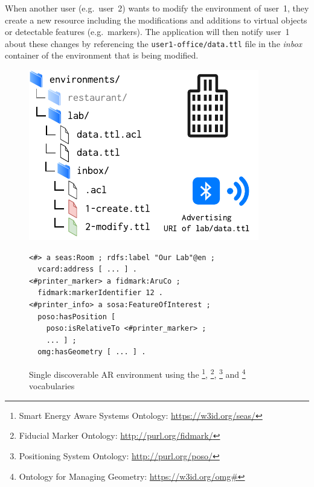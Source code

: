 When another user (e.g.~user~2) wants to modify the environment of user~1, they create a new resource including the modifications and additions to virtual objects or detectable features (e.g.~markers). The application will then notify user~1 about these changes by referencing the \texttt{user1-office/data.ttl} file in the \emph{inbox}~\cite{10.1007/978-3-319-58068-5_33} container of the environment that is being modified.

\begin{figure}[htb]
\begin{minipage}{1\columnwidth}
\begin{minipage}{.44\columnwidth}
\centering
    \includegraphics[scale=0.90]{images/sosy_architecture_2.pdf}
\end{minipage}
\begin{minipage}{.55\columnwidth}
\begin{verbatim}
<#> a seas:Room ; rdfs:label "Our Lab"@en ;
  vcard:address [ ... ] .
<#printer_marker> a fidmark:AruCo ;
  fidmark:markerIdentifier 12 .
<#printer_info> a sosa:FeatureOfInterest ;
  poso:hasPosition [ 
    poso:isRelativeTo <#printer_marker> ;
    ... ] ;
  omg:hasGeometry [ ... ] .
\end{verbatim}
\end{minipage}
\caption[Single discoverable AR environment]{Single discoverable AR environment using the 
\footnote{Smart Energy Aware Systems Ontology: \url{https://w3id.org/seas/}}, \footnote{Fiducial Marker Ontology: \url{http://purl.org/fidmark/}}, \footnote{Positioning System Ontology: \url{http://purl.org/poso/}} and \footnote{Ontology for Managing Geometry: \url{https://w3id.org/omg\#}} vocabularies}
\label{fig:architecture_2}
\end{minipage}
\vspace{-0.1cm}
\end{figure}

